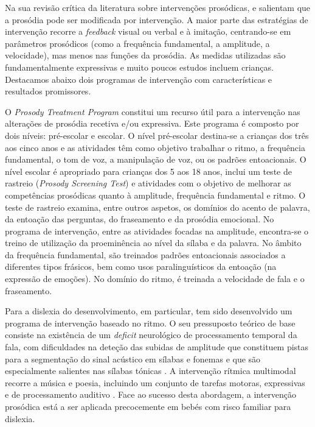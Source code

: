 \documentclass[output=paper,colorlinks,citecolor=brown,booklanguage=portuguese]{langscibook}
\begin{document}
Na sua revisão crítica da literatura sobre intervenções prosódicas, \citet{Hargrove2009} e \citet{Hargrove2013} salientam que a prosódia pode ser modificada por intervenção. A maior parte das estratégias de intervenção recorre a \emph{feedback} visual ou verbal e à imitação, centrando-se em parâmetros prosódicos (como a frequência fundamental, a amplitude, a velocidade), mas menos nas funções da prosódia. As medidas utilizadas são fundamentalmente expressivas e muito poucos estudos incluem crianças. Destacamos abaixo dois programas de intervenção com características e resultados promissores.

O \emph{Prosody Treatment Program} \citep{Rothstein2013} constitui um recurso útil para a intervenção nas alterações de prosódia recetiva e/ou expressiva. Este programa é composto por dois níveis: pré-escolar e escolar. O nível pré-escolar destina-se a crianças dos três aos cinco anos e as atividades têm como objetivo trabalhar o ritmo, a frequência fundamental, o tom de voz, a manipulação de voz, ou os padrões entoacionais. O nível escolar é apropriado para crianças dos 5 aos 18 anos, inclui um teste de rastreio (\emph{Prosody Screening Test}) e atividades com o objetivo de melhorar as competências prosódicas quanto à amplitude, frequência fundamental e ritmo. O teste de rastreio examina, entre outros aspetos, os domínios do acento de palavra, da entoação das perguntas, do fraseamento e da prosódia emocional. No programa de intervenção, entre as atividades focadas na amplitude, encontra-se o treino de utilização da proeminência ao nível da sílaba e da palavra. No âmbito da frequência fundamental, são treinados padrões entoacionais associados a diferentes tipos frásicos, bem como usos paralinguísticos da entoação (na expressão de emoções). No domínio do ritmo, é treinada a velocidade de fala e o fraseamento. 

Para a dislexia do desenvolvimento, em particular, tem sido desenvolvido um programa de intervenção baseado no ritmo. O seu pressuposto teórico de base consiste na existência de um \emph{deficit} neurológico de processamento temporal da fala, com dificuldades na deteção das subidas de amplitude que constituem pistas para a segmentação do sinal acústico em sílabas e fonemas e que são especialmente salientes nas sílabas tónicas \citep{Goswami2011}. A intervenção rítmica multimodal recorre a música e poesia, incluindo um conjunto de tarefas motoras, expressivas e de processamento auditivo \citep{Bhide2013}. Face ao sucesso desta abordagem, a intervenção prosódica está a ser aplicada precocemente em bebés com risco familiar para dislexia. 
\end{document}
